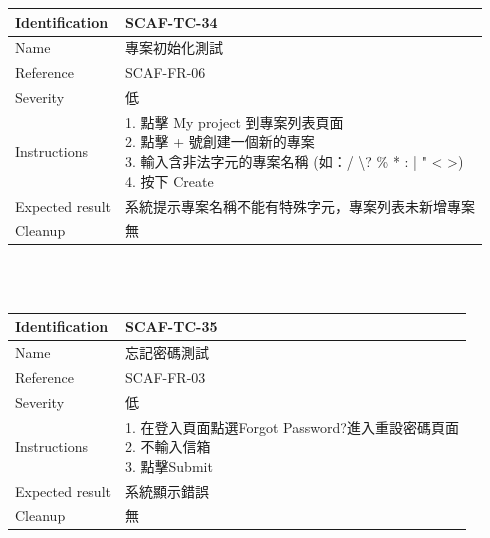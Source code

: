 \documentclass{report}
\begin{document}
\begin{tabularx}{\textwidth}{
  |p{}%
  |p{}|%
  }
  \hline
  \centering Identification &  SCAF-TC-34 \\
  \hline
  \centering Name & 專案初始化測試 \\
  \hline
  \centering Reference & SCAF-FR-06 \\
  \hline
  \centering Severity & 低 \\
  \hline
  \centering Instructions & 
  \makecell[l]{
    1. 點擊 My project 到專案列表頁面 \\
    2. 點擊 + 號創建一個新的專案 \\
    3. 輸入含非法字元的專案名稱
    (如：/ \textbackslash ? \% * : |  " < >) \\
    4. 按下 Create
  }\\
  \hline
  \centering Expected result & 系統提示專案名稱不能有特殊字元，專案列表未新增專案 \\
  \hline
  \centering Cleanup & 無 \\
  \hline
\end{tabularx}
\\
\newline
\\
\begin{tabularx}{\textwidth}{
  |p{}%
  |p{}|%
  }
  \hline
  \centering Identification &  SCAF-TC-35 \\
  \hline
  \centering Name & 忘記密碼測試 \\
  \hline
  \centering Reference & SCAF-FR-03 \\
  \hline
  \centering Severity & 低 \\
  \hline
  \centering Instructions & 
  \makecell[l]{
    1. 在登入頁面點選Forgot Password?進入重設密碼頁面 \\
    2. 不輸入信箱  \\
    3. 點擊Submit \\
  }\\
  \hline
  \centering Expected result & 系統顯示錯誤 \\
  \hline
  \centering Cleanup & 無 \\
  \hline
\end{tabularx}
\\
\newline
\\
\end{document}
